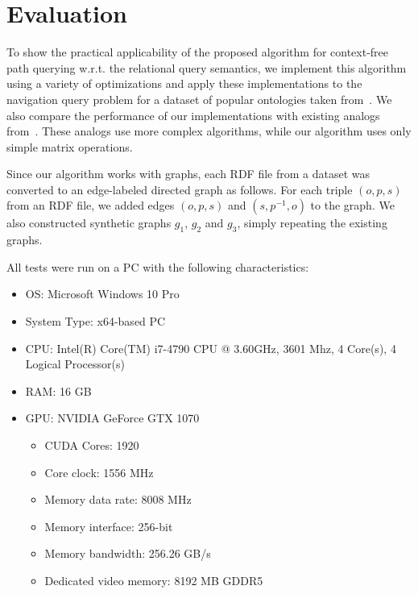 \section{Evaluation}
To show the practical applicability of the proposed algorithm for context-free path querying w.r.t. the relational query semantics, we implement this algorithm using a variety of optimizations and apply these implementations to the navigation query problem for a dataset of popular ontologies taken from~\cite{RDF}. We also compare the performance of our implementations with existing analogs from~\cite{GLL,RDF}. These analogs use more complex algorithms, while our algorithm uses only simple matrix operations.

Since our algorithm works with graphs, each RDF file from a dataset was converted to an edge-labeled directed graph as follows. For each triple $(o,p,s)$ from an RDF file, we added edges $(o,p,s)$ and $(s,p^{-1},o)$ to the graph. We also constructed synthetic graphs $g_1$, $g_2$ and $g_3$, simply repeating the existing graphs.

All tests were run on a PC with the following characteristics:
\begin{itemize}
    \item OS: Microsoft Windows 10 Pro
    \item System Type: x64-based PC
    \item CPU: Intel(R) Core(TM) i7-4790 CPU @ 3.60GHz, 3601 Mhz, 4 Core(s), 4 Logical Processor(s)
    \item RAM: 16 GB
    \item GPU: NVIDIA GeForce GTX 1070
    \begin{itemize}
        \item CUDA Cores:		1920 
        \item Core clock:		1556 MHz 
        \item Memory data rate:	8008 MHz
        \item Memory interface:	256-bit 
        \item Memory bandwidth:	256.26 GB/s
        \item Dedicated video memory:	8192 MB GDDR5
    \end{itemize}
\end{itemize}

